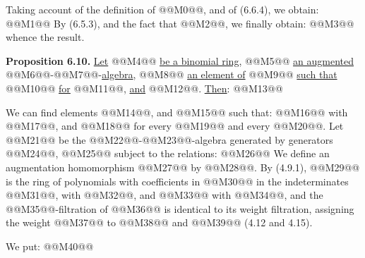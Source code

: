 Taking account of the definition of @@M0@@, and of (6.6.4), we obtain:
@@M1@@
By (6.5.3), and the fact that @@M2@@, we finally obtain:
@@M3@@
whence the result.

\textbf{Proposition 6.10.} \uline{Let} @@M4@@ \uline{be a binomial ring}, @@M5@@ \uline{an augmented} @@M6@@-@@M7@@-\uline{algebra}, @@M8@@ \uline{an element of} @@M9@@ \uline{such that} @@M10@@ \uline{for} @@M11@@, \uline{and} @@M12@@. \uline{Then}:
@@M13@@

We can find elements @@M14@@, and @@M15@@ such that:
@@M16@@
with @@M17@@, and @@M18@@ for every @@M19@@ and every @@M20@@. Let @@M21@@ be the @@M22@@-@@M23@@-algebra generated by generators @@M24@@, @@M25@@ subject to the relations:
@@M26@@
We define an augmentation homomorphism @@M27@@ by @@M28@@. By (4.9.1), @@M29@@ is the ring of polynomials with coefficients in @@M30@@ in the indeterminates @@M31@@, with @@M32@@, and @@M33@@ with @@M34@@, and the @@M35@@-filtration of @@M36@@ is identical to its weight filtration, assigning the weight @@M37@@ to @@M38@@ and @@M39@@ (4.12 and 4.15).

We put:
@@M40@@
